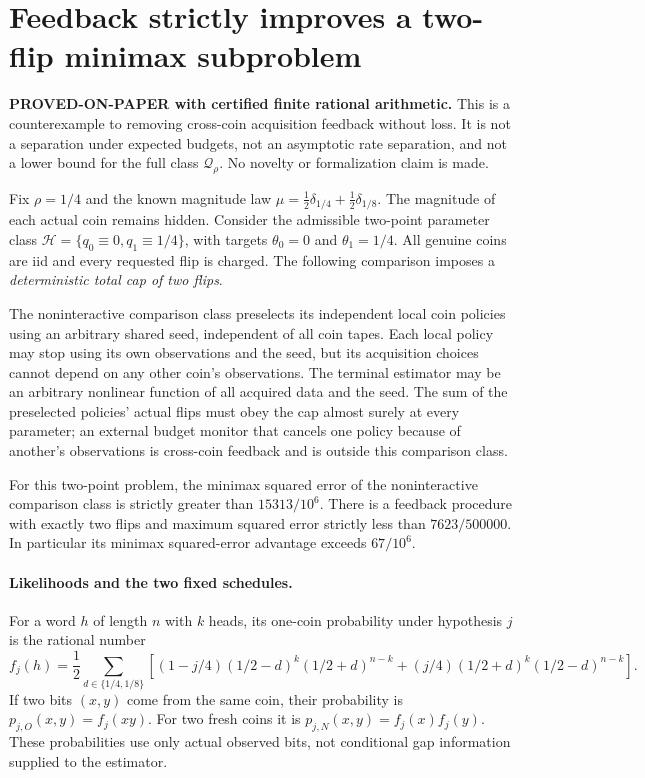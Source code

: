 \section{Feedback strictly improves a two-flip minimax subproblem}
\label{sec:feedback-counterexample}
\noindent\textbf{PROVED-ON-PAPER with certified finite rational arithmetic.}
This is a counterexample to removing cross-coin acquisition feedback without
loss. It is not a separation under expected budgets, not an asymptotic rate
separation, and not a lower bound for the full class $\mathcal Q_\rho$.
No novelty or formalization claim is made.

Fix $\rho=1/4$ and the known magnitude law
$\mu=\tfrac12\delta_{1/4}+\tfrac12\delta_{1/8}$.
The magnitude of each actual coin remains hidden. Consider the admissible
two-point parameter class
$\mathcal H=\{q_0\equiv0,q_1\equiv1/4\}$, with targets
$\theta_0=0$ and $\theta_1=1/4$.
All genuine coins are iid and every requested flip is charged. The
following comparison imposes a \emph{deterministic total cap of two flips}.

The noninteractive comparison class preselects its independent local coin
policies using an arbitrary shared seed, independent of all coin tapes.
Each local policy may stop using its own observations and the seed, but its
acquisition choices cannot depend on any other coin's observations. The
terminal estimator may be an arbitrary nonlinear function of all acquired
data and the seed. The sum of the preselected policies' actual flips must
obey the cap almost surely at every parameter; an external budget monitor
that cancels one policy because of another's observations is cross-coin
feedback and is outside this comparison class.

\begin{theorem}\label{feedback:strict}
For this two-point problem, the minimax squared error of the noninteractive
comparison class is strictly greater than $15313/10^6$.
There is a feedback procedure with exactly two flips and maximum squared
error strictly less than $7623/500000$.
In particular its minimax squared-error advantage exceeds $67/10^6$.
\end{theorem}

\paragraph{Likelihoods and the two fixed schedules.}
For a word $h$ of length $n$ with $k$ heads, its one-coin probability under
hypothesis $j$ is the rational number
\[
 f_j(h)=\frac12\sum_{d\in\{1/4,1/8\}}
 \left[(1-j/4)(1/2-d)^k(1/2+d)^{n-k}
       +(j/4)(1/2+d)^k(1/2-d)^{n-k}\right].
\]
If two bits $(x,y)$ come from the same coin, their probability is
$p_{j,O}(x,y)=f_j(xy)$. For two fresh coins it is
$p_{j,N}(x,y)=f_j(x)f_j(y)$.
These probabilities use only actual observed bits, not conditional gap
information supplied to the estimator.


